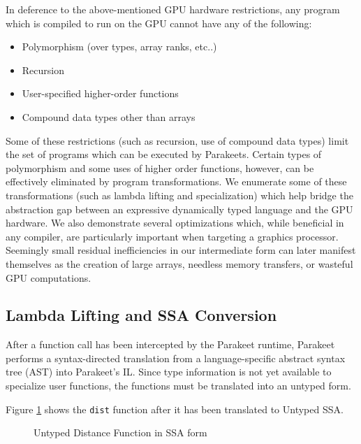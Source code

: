 \documentclass[10pt,twocolumn]{article}
\begin{document}
In deference to the above-mentioned GPU hardware restrictions, any program which is compiled to run on the GPU cannot have any of the following:

\begin{itemize}
\item Polymorphism (over types, array ranks, etc..) 
\item Recursion
\item User-specified higher-order functions
\item Compound data types other than arrays
\end{itemize}

Some of these restrictions (such as recursion, use of compound data types) limit the set of programs which can be executed by Parakeets. Certain types of polymorphism and some uses of higher order functions, however, can be effectively eliminated by program transformations. We enumerate some of these transformations (such as lambda lifting and specialization) which help bridge the abstraction gap between an expressive dynamically typed language and the GPU hardware. We also demonstrate several optimizations which, while beneficial in any compiler, are particularly important when targeting a graphics processor. Seemingly small residual inefficiencies in our intermediate form can later manifest themselves as the creation of large arrays, needless memory transfers, or wasteful GPU computations.

\subsection{Lambda Lifting and SSA Conversion}
After a function call has been intercepted by the Parakeet runtime, Parakeet performs a syntax-directed translation from a language-specific abstract syntax tree (AST) into Parakeet's IL. Since type information is not yet available to specialize user functions, the functions must be translated into an untyped
form. 

Figure \ref{UntypedSSADist} shows the \texttt{dist} function after it has been translated to Untyped SSA.

\begin{figure}[h!]
\caption{Untyped Distance Function in SSA form}
\label{UntypedSSADist}
\end{figure}
\end{document}
